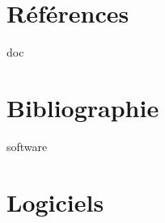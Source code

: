 \documentclass[12pt,a4paper]{report}
\begin{document}
\section{Références}
\vspace*{1cm}


\begin{btSect}{doc}
\section*{Bibliographie}
\btPrintCited
\end{btSect}
\label{biblio}


\begin{btSect}{software}
\section*{Logiciels}
\btPrintCited
\end{btSect}
\label{software}
\end{document}
